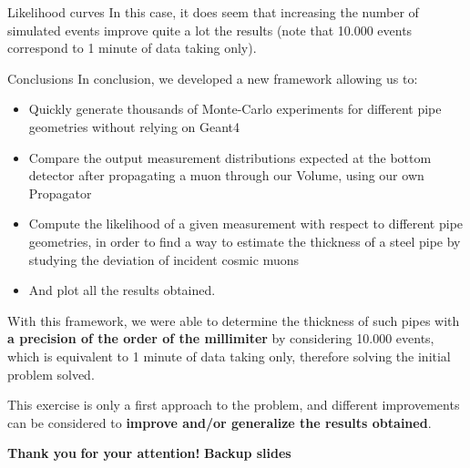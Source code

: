 \documentclass[8 pt]{beamer}
\begin{document}
\begin{frame}{Likelihood curves}
In this case, it does seem that increasing the number of simulated events improve quite a lot the results (note that 10.000 events correspond to 1 minute of data taking only). \vfill
\end{frame}










\begin{frame}{Conclusions}
\justifying
In conclusion, we developed a new framework allowing us to:
\begin{itemize}
\justifying
\item Quickly generate thousands of Monte-Carlo experiments for different pipe geometries without relying on Geant4
\item Compare the output measurement distributions expected at the bottom detector after propagating a muon through our Volume, using 	our own Propagator
\item Compute the likelihood of a given measurement with respect to different pipe geometries, in order to find a way to estimate the thickness of a steel pipe by studying the deviation of incident cosmic muons
\item And plot all the results obtained.
\end{itemize} \vfill

\begin{exampleblock}{}
\justifying
With this framework, we were able to determine the thickness of such pipes with \textbf{a precision of the order of the millimiter} by considering 10.000 events, which is equivalent to 1 minute of data taking only, therefore solving the initial problem solved. 
\end{exampleblock} \vfill

This exercise is only a first approach to the problem, and different improvements can be considered to \textbf{improve and/or generalize the results obtained}. \vfill
\end{frame}










\begin{frame}{}
	\centering
	\huge{\textbf{\color{mycolor} Thank you  \color{black}}} \newline
	\LARGE{\textbf{\color{mycolor} for your attention! \color{black}}} \vfill
	\LARGE{\textbf{\color{mycolor} Backup slides \color{black}}}
\end{frame}
\end{document}
